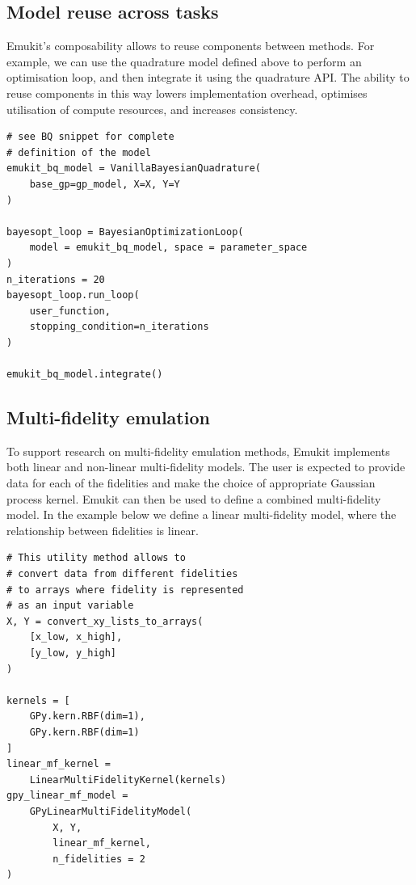 \subsection{Model reuse across tasks}

Emukit's composability allows to reuse components between methods. For example, we can use the quadrature model defined above to perform an optimisation loop, and then integrate it using the quadrature API. The ability to reuse components in this way lowers implementation overhead, optimises utilisation of compute resources, and increases consistency.

\begin{verbatim}
# see BQ snippet for complete
# definition of the model
emukit_bq_model = VanillaBayesianQuadrature(
    base_gp=gp_model, X=X, Y=Y
)

bayesopt_loop = BayesianOptimizationLoop(
    model = emukit_bq_model, space = parameter_space
)
n_iterations = 20
bayesopt_loop.run_loop(
    user_function,
    stopping_condition=n_iterations
)

emukit_bq_model.integrate()
\end{verbatim}


\subsection{Multi-fidelity emulation}

To support research on multi-fidelity emulation methods, Emukit implements both linear and non-linear multi-fidelity models. The user is expected to provide data for each of the fidelities and make the choice of appropriate Gaussian process kernel. Emukit can then be used to define a combined multi-fidelity model. In the example below we define a linear multi-fidelity model, where the relationship between fidelities is linear.

\begin{verbatim}
# This utility method allows to
# convert data from different fidelities
# to arrays where fidelity is represented
# as an input variable
X, Y = convert_xy_lists_to_arrays(
    [x_low, x_high],
    [y_low, y_high]
)

kernels = [
    GPy.kern.RBF(dim=1),
    GPy.kern.RBF(dim=1)
]
linear_mf_kernel =
    LinearMultiFidelityKernel(kernels)
gpy_linear_mf_model =
    GPyLinearMultiFidelityModel(
        X, Y,
        linear_mf_kernel,
        n_fidelities = 2
)
\end{verbatim}

